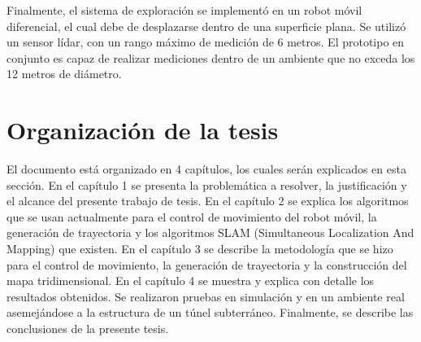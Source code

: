 Finalmente, el sistema de exploración se implementó en un robot móvil diferencial, el 
cual debe de desplazarse dentro de una superficie plana. Se utilizó un sensor lídar, con
un rango máximo de medición de 6 metros. El prototipo en conjunto es capaz de realizar 
mediciones dentro de un ambiente que no exceda los 12 metros de diámetro.




\section{Organizaci\'on de la tesis}

El documento está organizado en 4 capítulos, los cuales serán explicados en esta
sección. En el capítulo 1 se presenta la problemática a resolver, la justificación y 
el alcance del presente trabajo de tesis. En el capítulo 2 se explica los algoritmos 
que se usan actualmente para el control de movimiento del robot móvil, la generación 
de trayectoria y  los algoritmos SLAM (Simultaneous Localization And Mapping) que 
existen. En el capítulo 3 se describe la metodología que se hizo para el control de 
movimiento, la generación de trayectoria y la construcción del mapa tridimensional. En 
el capítulo 4 se muestra y explica con detalle los resultados obtenidos. Se 
realizaron pruebas en simulación y en un ambiente real asemejándose a la estructura de 
un túnel subterráneo. Finalmente, se describe las conclusiones de la presente tesis.